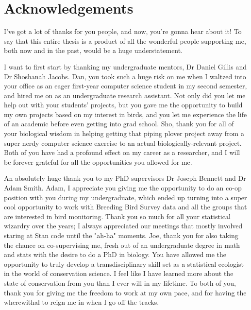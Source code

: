 \chapter*{Acknowledgements}


\par I've got a lot of thanks for you people, and now, you're gonna hear about it! 
To say that this entire thesis is a product of all the wonderful people supporting me, both now and in the past, would be a huge understatement.

\par I want to first start by thanking my undergraduate mentors, Dr Daniel Gillis and Dr Shoshanah Jacobs.
Dan, you took such a huge risk on me when I waltzed into your office as an eager first-year computer science student in my second semester, and hired me on as an undergraduate research assistant.
Not only did you let me help out with your students' projects, but you gave me the opportunity to build my own projects based on my interest in birds, and you let me experience the life of an academic before even getting into grad school.
Sho, thank you for all of your biological wisdom in helping getting that piping plover project away from a super nerdy computer science exercise to an actual biologically-relevant project. 
Both of you have had a profound effect on my career as a researcher, and I will be forever grateful for all the opportunities you allowed for me.

\par An absolutely huge thank you to my PhD supervisors Dr Joseph Bennett and Dr Adam Smith.
Adam, I appreciate you giving me the opportunity to do an co-op position with you during my undergraduate, which ended up turning into a super cool opportunity to work with Breeding Bird Survey data and all the groups that are interested in bird monitoring.
Thank you so much for all your statistical wizardry over the years; I always appreciated our meetings that mostly involved staring at Stan code until the "ah-ha" moments.
Joe, thank you for also taking the chance on co-supervising me, fresh out of an undergraduate degree in math and stats with the desire to do a PhD in biology.
You have allowed me the opportunity to truly develop a transdisciplinary skill set as a statistical ecologist in the world of conservation science.
I feel like I have learned more about the state of conservation from you than I ever will in my lifetime.
To both of you, thank you for giving me the freedom to work at my own pace, and for having the wherewithal to reign me in when I go off the tracks.

